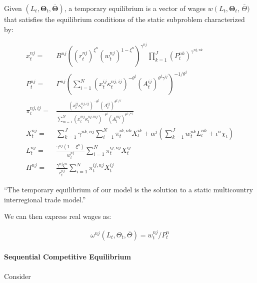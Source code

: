 \documentclass[10pt]{article}
\begin{document}
\begin{definition} 
    
    Given $\left(L_t, \boldsymbol{\Theta}_t, \overline{\boldsymbol{\Theta}}\right)$, a temporary equilibrium is a vector of wages $w\left(L_t, \boldsymbol{\Theta}_t\right.$, $\bar{\Theta})$ that 
    satisfies the equilibrium conditions of the static subproblem
    characterized by:

    \begin{align}
        x_t^{n j}=&B^{n j}\left(\left(r_t^{n j}\right)^{\xi^n}\left(w_t^{n j}\right)^{1-\xi^n}\right)^{\gamma^{n j}} \prod_{k=1}^J\left(P_t^{n k}\right)^{\gamma^{n j, n k}} \\
        P_t^{n j}=&\Gamma^{n j}\left(\sum_{i=1}^N\left(x_t^{i j} \kappa_t^{n j, i j}\right)^{-\theta^j}\left(A_t^{i j}\right)^{\theta^j \gamma^{i j}}\right)^{-1 / \theta^j} \\
        \pi_t^{n j, i j}=&\frac{\left(x_t^{i j} \kappa_t^{n j, i j}\right)^{-\theta^j}\left(A_t^{i j}\right)^{\theta^j \gamma^{i j}}}{\sum_{m=1}^N\left(x_t^{m j} \kappa_t^{n j, m j}\right)^{-\theta^j}\left(A_t^{m j}\right)^{\theta^j \gamma^{m j}}} \\
        X_t^{n j}=&\sum_{k=1}^J \gamma^{n k, n j} \sum_{i=1}^N \pi_t^{i k, n k} X_t^{i k}+\alpha^j\left(\sum_{k=1}^J w_t^{n k} L_t^{n k}+\iota^n \chi_t\right) \\
        L_t^{n j}=&\frac{\gamma^{n j}\left(1-\xi^n\right)}{w_t^{n j}} \sum_{i=1}^N \pi_t^{i j, n j} X_t^{i j} \\
        H^{n j}=&\frac{\gamma^{n j} \xi^n}{r_t^{n j}} \sum_{i=1}^N \pi_t^{i j, n j} X_t^{i j}
    \end{align}

\end{definition}

``The temporary equilibrium of our model is the solution 
to a static multicountry interregional trade model.''

We can then express real wages as:

\begin{align}
    \omega^{n j}\left(L_t, \Theta_t, \bar{\Theta}\right)=w_t^{n j} / P_t^n
\end{align}

\paragraph{Sequential Competitive Equilibrium}

Consider
\end{document}
